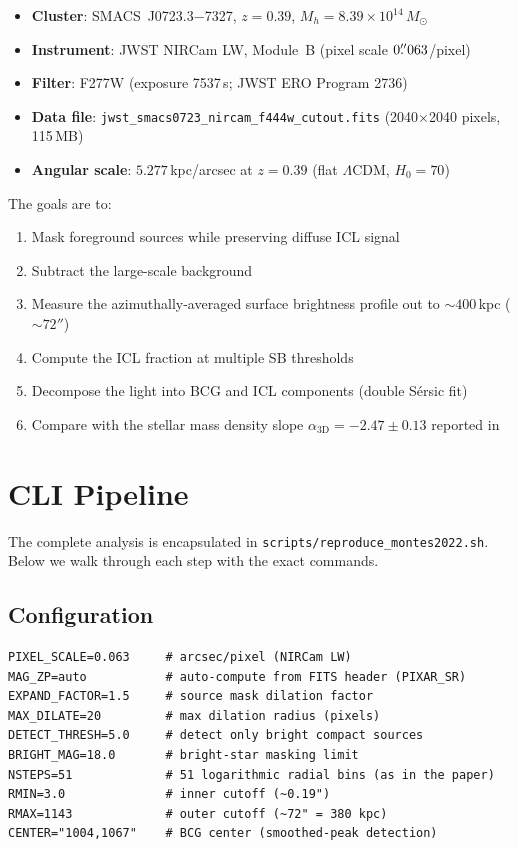 \documentclass[11pt,fleqn]{book}
\begin{document}
\begin{itemize}
  \item \textbf{Cluster}: SMACS~J0723.3$-$7327, $z=0.39$,
        $M_h = 8.39\times10^{14}\,M_\odot$
  \item \textbf{Instrument}: JWST NIRCam LW, Module~B
        (pixel scale $0\rlap{.}{''}063$/pixel)
  \item \textbf{Filter}: F277W (exposure 7537\,s; JWST ERO Program 2736)
  \item \textbf{Data file}: \texttt{jwst\_smacs0723\_nircam\_f444w\_cutout.fits}
        (2040$\times$2040 pixels, 115\,MB)
  \item \textbf{Angular scale}: $5.277$\,kpc/arcsec at $z=0.39$
        (flat $\Lambda$CDM, $H_0=70$)
\end{itemize}

\noindent
The goals are to:
\begin{enumerate}
  \item Mask foreground sources while preserving diffuse ICL signal
  \item Subtract the large-scale background
  \item Measure the azimuthally-averaged surface brightness profile
        out to ${\sim}400$\,kpc (${\sim}72''$)
  \item Compute the ICL fraction at multiple SB thresholds
  \item Decompose the light into BCG and ICL components
        (double S\'ersic fit)
  \item Compare with the stellar mass density slope
        $\alpha_\mathrm{3D} = -2.47 \pm 0.13$ reported in \textcite{montes2022}
\end{enumerate}


\section{CLI Pipeline}
\label{sec:example-cli}

The complete analysis is encapsulated in
\texttt{scripts/reproduce\_montes2022.sh}.
Below we walk through each step with the exact commands.

\subsection{Configuration}

\begin{codebox}
\begin{lstlisting}[style=bash,numbers=none]
PIXEL_SCALE=0.063     # arcsec/pixel (NIRCam LW)
MAG_ZP=auto           # auto-compute from FITS header (PIXAR_SR)
EXPAND_FACTOR=1.5     # source mask dilation factor
MAX_DILATE=20         # max dilation radius (pixels)
DETECT_THRESH=5.0     # detect only bright compact sources
BRIGHT_MAG=18.0       # bright-star masking limit
NSTEPS=51             # 51 logarithmic radial bins (as in the paper)
RMIN=3.0              # inner cutoff (~0.19")
RMAX=1143             # outer cutoff (~72" = 380 kpc)
CENTER="1004,1067"    # BCG center (smoothed-peak detection)
\end{lstlisting}
\end{codebox}
\end{document}
